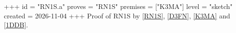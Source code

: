 +++
id = "RN1S.a"
proves = "RN1S"
premises = ["K3MA"]
level = "sketch"
created = 2026-11-04
+++
Proof of RN1S by \ref{RN1S}, \ref{D3FN}, \ref{K3MA} and \ref{1DDB}.
